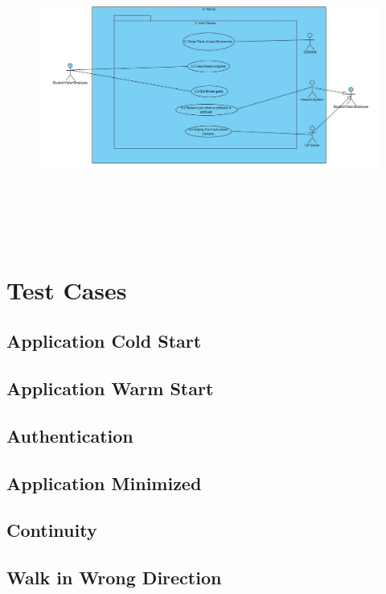 \documentclass[12pt, a4paper]{article}
\begin{document}
\begin{center}
\begin{itemize}
			\begin{figure}[H]\includegraphics[width = \textwidth, height = 10cm]{User_fitness.JPG} \end{figure}

	\end{itemize}
	\end{center}
			\section{Test Cases}
			\subsection{Application Cold Start} %
			\subsection{Application Warm Start} %
			\subsection {Authentication} %
			\subsection{Application Minimized} %
			\subsection{Continuity} %
			\subsection{Walk in Wrong Direction} %
\end{document}

